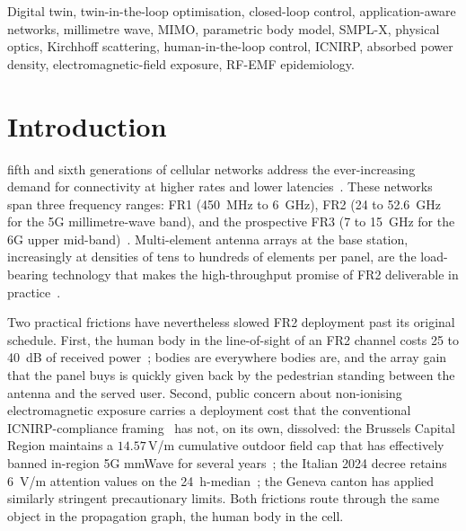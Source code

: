 \documentclass[journal,twocolumn,10pt]{IEEEtran}
\theoremstyle{plain}
\theoremstyle{definition}
\theoremstyle{remark}
\begin{document}
\begin{IEEEkeywords}
Digital twin, twin-in-the-loop optimisation, closed-loop control,
application-aware networks, millimetre wave, MIMO, parametric body
model, SMPL-X, physical optics, Kirchhoff scattering, human-in-the-loop
control, ICNIRP, absorbed power density, electromagnetic-field
exposure, RF-EMF epidemiology.
\end{IEEEkeywords}

\IEEEpeerreviewmaketitle


\section{Introduction}\label{sec:intro}

 fifth and sixth generations of cellular networks
address the ever-increasing demand for connectivity at higher rates
and lower latencies~\cite{general5G}. These networks span three
frequency ranges: FR1 (450~MHz to 6~GHz), FR2 (24 to 52.6~GHz for
the 5G millimetre-wave band), and the prospective FR3 (7 to 15~GHz
for the 6G upper mid-band)~\cite{TS38214}. Multi-element antenna
arrays at the base station, increasingly at densities of tens to
hundreds of elements per panel, are the load-bearing technology
that makes the high-throughput promise of FR2 deliverable in
practice~\cite{HeathLozanoFA2018}.

Two practical frictions have nevertheless slowed FR2 deployment
past its original schedule. First, the human body in the
line-of-sight of an FR2 channel costs 25 to 40~dB of received
power~\cite{MacCartney2017,Maccartney2017blockage}; bodies are
everywhere bodies are, and the array gain that the panel buys is
quickly given back by the pedestrian standing between the antenna
and the served user. Second, public concern about non-ionising
electromagnetic exposure carries a deployment cost that the
conventional ICNIRP-compliance framing~\cite{ICNIRP2020} has not,
on its own, dissolved: the Brussels Capital Region maintains a
$14.57\,$V/m cumulative outdoor field cap that has effectively
banned in-region 5G mmWave for several
years~\cite{BrusselsArrete2007,BrusselsArrete2024}; the Italian
2024 decree retains 6~V/m attention values on the
24~h-median~\cite{ItalyDL}; the Geneva canton has applied
similarly stringent precautionary limits. Both frictions route
through the same object in the propagation graph, the human body
in the cell.
\end{document}
